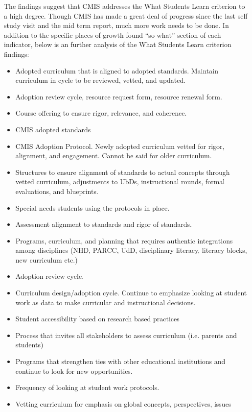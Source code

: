 \begin{findings}
The findings suggest that CMIS addresses the What Students Learn criterion to a high degree. Though CMIS has made a great deal of progress since the last self study visit and the mid term report, much more work needs to be done. In addition to the specific places of growth found “so what” section of each indicator, below is an further analysis of the What Students Learn criterion findings:


\begin{itemize}
\item Adopted curriculum that is aligned to adopted standards. Maintain curriculum in cycle to be reviewed, vetted, and updated.  
\item Adoption review cycle, resource request form, resource renewal form.
\item Course offering to ensure rigor, relevance, and coherence. 
\item CMIS adopted standards 
\item CMIS Adoption Protocol. Newly adopted curriculum vetted for rigor, alignment, and engagement. Cannot be said for older curriculum. 
\item Structures to ensure alignment of standards to actual concepts through vetted curriculum, adjustments to UbDs, instructional rounds, formal evaluations, and blueprints. 
\item Special needs students using the protocols in place. 
\item Assessment alignment to standards and rigor of standards. 
\item Programs, curriculum, and planning that requires authentic integrations among disciplines (NHD, PARCC, UdD, disciplinary literacy, literacy blocks, new curriculum etc.)
\item Adoption review cycle. 
\item Curriculum design/adoption cycle. Continue to emphasize looking at student work as data to make curricular and instructional decisions. 
\end{itemize}


\begin{itemize}
\item Student accessibility based on research based practices 
\item Process that invites all stakeholders to assess curriculum (i.e. parents and students)
\item Programs that strengthen ties with other educational institutions and continue to look for new opportunities. 
\item Frequency of looking at student work protocols.
\item Vetting curriculum for emphasis on global concepts, perspectives, issues
\end{itemize}


\end{findings}
